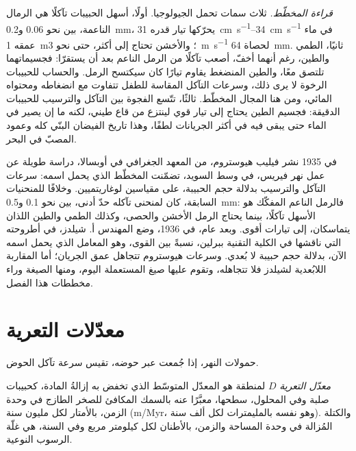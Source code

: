 \emph{قراءة المخطّط.} ثلاث سمات تحمل الجيولوجيا. أولًا، أسهل الحبيبات تآكلًا هي الرمال الناعمة، بين نحو \num{0.06} و\qty{0.2}{mm}، يحرّكها تيار قدره \qtyrange{31}{34}{cm.s^{-1}} في ماء عمقه \qty{1}{m}؛ والأخشن تحتاج إلى أكثر، حتى نحو \qty{3}{m.s^{-1}} لحصاة \qty{64}{mm}. ثانيًا، الطمي والطين، رغم أنهما أخفّ، أصعب تآكلًا من الرمل الناعم بعد أن يستقرّا: فجسيماتهما تلتصق معًا، والطين المنضغط يقاوم تيارًا كان سيكتسح الرمل. والحساب للحبيبات الرخوة لا يرى ذلك، وسرعات التآكل المقاسة للطفل تتفاوت مع انضغاطه ومحتواه المائي، ومن هنا المجال المخطّط. ثالثًا، تتّسع الفجوة بين التآكل والترسيب للحبيبات الدقيقة: فجسيم الطين يحتاج إلى تيار قوي لينتزع من قاع طيني، لكنه ما إن يصير في الماء حتى يبقى فيه في أكثر الجريانات لطفًا، وهذا تاريخ الفيضان البنّي كله وعمود المصبّ في البحر.

\begin{history}
في 1935 نشر فيليب هيوستروم، من المعهد الجغرافي في أوبسالا، دراسة طويلة عن عمل نهر فيريس، في وسط السويد، تضمّنت المخطّط الذي يحمل اسمه: سرعات التآكل والترسيب بدلالة حجم الحبيبة، على مقياسين لوغاريتميين. وخلافًا للمنحنيات السابقة، كان لمنحنى تآكله حدّ أدنى، بين نحو \num{0.1} و\qty{0.5}{mm}: فالرمل الناعم المفكّك هو الأسهل تآكلًا، بينما يحتاج الرمل الأخشن والحصى، وكذلك الطمي والطين اللذان يتماسكان، إلى تيارات أقوى. وبعد عام، في 1936، وضع المهندس أ. شيلدز، في أطروحته التي ناقشها في الكلية التقنية ببرلين،  نسبةً بين القوى، وهو المعامل الذي يحمل اسمه الآن، بدلالة حجم حبيبة لا بُعدي. وسرعات هيوستروم تتجاهل عمق الجريان؛ أما المقاربة اللابُعدية لشيلدز فلا تتجاهله، وتقوم عليها صيغ  المستعملة اليوم، ومنها الصيغة وراء مخططات هذا الفصل.
\end{history}

\section{معدّلات التعرية}\label{sec:b1:erosion-transport:denudation}

حمولات النهر، إذا جُمعت عبر حوضه، تقيس سرعة تآكل الحوض.

\begin{definition}\label{def:b1:erosion-transport:denudation}
\emph{معدّل التعرية} $D$ لمنطقة هو المعدّل المتوسّط الذي تخفض به إزالةُ المادة، كحبيبات صلبة وفي المحلول، سطحها، معبَّرًا عنه بالسمك المكافئ للصخر الطازج في وحدة الزمن، بالأمتار لكل مليون سنة (\unit{m/Myr}، وهو نفسه بالمليمترات لكل ألف سنة). والكتلة المُزالة في وحدة المساحة والزمن، بالأطنان لكل كيلومتر مربع وفي السنة، هي غلّة الرسوب النوعية.
\end{definition}

